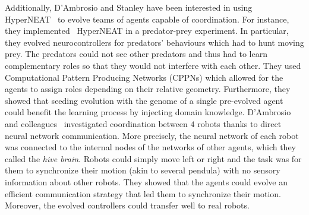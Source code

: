     Additionally, D'Ambrosio and Stanley have been interested in using HyperNEAT~\parencite{Stanley2009a} to evolve teams of agents capable of coordination. For instance, they implemented~\parencite{DAmbrosio2008} HyperNEAT in a predator-prey experiment. In particular, they evolved neurocontrollers for predators' behaviours which had to hunt moving prey. The predators could not see other predators and thus had to learn complementary roles so that they would not interfere with each other. They used Computational Pattern Producing Networks (CPPNs) which allowed for the agents to assign roles depending on their relative geometry. Furthermore, they showed that seeding evolution with the genome of a single pre-evolved agent could benefit the learning process by injecting domain knowledge. D'Ambrosio and colleagues~\parencite{DAmbrosio2012} investigated coordination between $4$ robots thanks to direct neural network communication. More precisely, the neural network of each robot was connected to the internal nodes of the networks of other agents, which they called the \emph{hive brain}. Robots could simply move left or right and the task was for them to synchronize their motion (akin to several pendula) with no sensory information about other robots. They showed that the agents could evolve an efficient communication strategy that led them to synchronize their motion. Moreover, the evolved controllers could transfer well to real robots.


